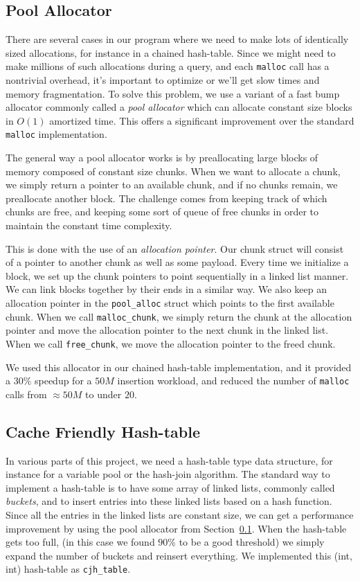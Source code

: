 \documentclass[a4paper, 12pt]{article}
\begin{document}
\subsection{Pool Allocator}
\label{poolalloc}
There are several cases in our program where we need to make lots of identically sized allocations, for instance in a chained hash-table. Since we might need to make millions of such allocations during a query, and each \texttt{malloc} call has a nontrivial overhead, it's important to optimize or we'll get slow times and memory fragmentation. To solve this problem, we use a variant of a fast bump allocator commonly called a \textit{pool allocator} which can allocate constant size blocks in $O(1)$ amortized time. This offers a significant improvement over the standard \texttt{malloc} implementation.

\medskip
The general way a pool allocator works is by preallocating large blocks of memory composed of constant size chunks. When we want to allocate a chunk, we simply return a pointer to an available chunk, and if no chunks remain, we preallocate another block. The challenge comes from keeping track of which chunks are free, and keeping some sort of queue of free chunks in order to maintain the constant time complexity. 

\medskip
This is done with the use of an \textit{allocation pointer}. Our chunk struct will consist of a pointer to another chunk as well as some payload. Every time we initialize a block, we set up the chunk pointers to point sequentially in a linked list manner. We can link blocks together by their ends in a similar way. We also keep an allocation pointer in the \texttt{pool\_alloc} struct which points to the first available chunk. When we call \texttt{malloc\_chunk}, we simply return the chunk at the allocation pointer and move the allocation pointer to the next chunk in the linked list. When we call \texttt{free\_chunk}, we move the allocation pointer to the freed chunk. 

\medskip
We used this allocator in our chained hash-table implementation, and it provided a 30\% speedup for a $50M$ insertion workload, and reduced the number of \texttt{malloc} calls from $\approx 50 M$ to under $20$. 

\subsection{Cache Friendly Hash-table}
\label{hashtable}

In various parts of this project, we need a hash-table type data structure, for instance for a variable pool or the hash-join algorithm. The standard way to implement a hash-table is to have some array of linked lists, commonly called \textit{buckets}, and to insert entries into these linked lists based on a hash function. Since all the entries in the linked lists are constant size, we can get a performance improvement by using the pool allocator from Section~\ref{poolalloc}. When the hash-table gets too full, (in this case we found $90\%$ to be a good threshold) we simply expand the number of buckets and reinsert everything. We implemented this (int, int) hash-table as \texttt{cjh\_table}.
\end{document}
